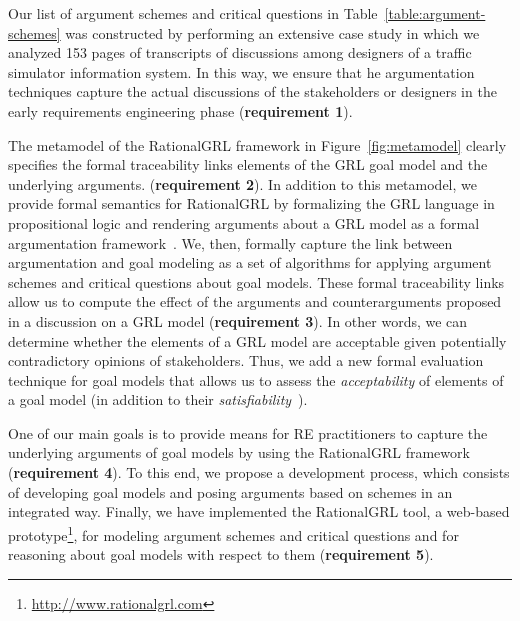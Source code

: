 Our list of argument schemes and critical questions in Table~\ref{table:argument-schemes} was constructed by performing an extensive case study in which we analyzed 153 pages of transcripts of discussions among designers of a traffic simulator information system. In this way, we ensure that he argumentation techniques capture the actual discussions of the stakeholders or designers in the early requirements engineering phase (\textbf{requirement 1}).  

The metamodel of the RationalGRL framework in Figure~\ref{fig:metamodel} clearly specifies the formal traceability links elements of the GRL goal model and the underlying arguments. (\textbf{requirement 2}). In addition to this metamodel, we provide formal semantics for RationalGRL by formalizing the GRL language in propositional logic and rendering arguments about a GRL model as a formal argumentation framework~\cite{Dung1995}. We, then, formally capture the link between argumentation and goal modeling as a set of algorithms for applying argument schemes and critical questions about goal models. These formal traceability links allow us to compute the effect of the arguments and counterarguments proposed in a discussion on a GRL model (\textbf{requirement 3}). In other words, we can determine whether the elements of a GRL model are acceptable given potentially contradictory opinions of stakeholders. Thus, we add a new formal evaluation technique for goal models that allows us to assess the \emph{acceptability} of elements of a goal model (in addition to their \emph{satisfiability}~\cite{Amyot:2010:EGM:1841349.1841356}).

One of our main goals is to provide means for RE practitioners to capture the underlying arguments of goal models by using the RationalGRL framework (\textbf{requirement 4}). To this end, we propose a development process, which consists of developing goal models and posing arguments based on schemes in an integrated way. Finally, we have implemented the RationalGRL tool, a web-based prototype\footnote{\url{http://www.rationalgrl.com}}, for modeling argument schemes and critical questions and for reasoning about goal models with respect to them (\textbf{requirement 5}). 
